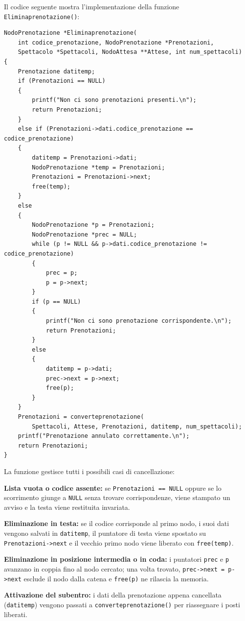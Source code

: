 \documentclass[11pt,a4paper,oneside,openany]{book}
\newenvironment{listacomp}{%
    \small
    \begin{list}{\textendash}{%
        \setlength{\topsep}{2pt}%
        \setlength{\partopsep}{0pt}%
        \setlength{\itemsep}{1pt}%
        \setlength{\parsep}{0pt}%
        \setlength{\leftmargin}{1.2em}%
    }%
}{%
    \end{list}%
}
\begin{document}
\begin{samepage}
Il codice seguente mostra l'implementazione della funzione \texttt{Eliminaprenotazione()}:

\begin{lstlisting}[caption={Eliminazione di un nodo dalla lista delle prenotazioni}]
NodoPrenotazione *Eliminaprenotazione(
    int codice_prenotazione, NodoPrenotazione *Prenotazioni,
    Spettacolo *Spettacoli, NodoAttesa **Attese, int num_spettacoli)
{
    Prenotazione datitemp;
    if (Prenotazioni == NULL)
    {
        printf("Non ci sono prenotazioni presenti.\n");
        return Prenotazioni;
    }
    else if (Prenotazioni->dati.codice_prenotazione == codice_prenotazione)
    {
        datitemp = Prenotazioni->dati;
        NodoPrenotazione *temp = Prenotazioni;
        Prenotazioni = Prenotazioni->next;
        free(temp);
    }
    else
    {
        NodoPrenotazione *p = Prenotazioni;
        NodoPrenotazione *prec = NULL;
        while (p != NULL && p->dati.codice_prenotazione != codice_prenotazione)
        {
            prec = p;
            p = p->next;
        }
        if (p == NULL)
        {
            printf("Non ci sono prenotazione corrispondente.\n");
            return Prenotazioni;
        }
        else
        {
            datitemp = p->dati;
            prec->next = p->next;
            free(p);
        }
    }
    Prenotazioni = converteprenotazione(
        Spettacoli, Attese, Prenotazioni, datitemp, num_spettacoli);
    printf("Prenotazione annulato correttamente.\n");
    return Prenotazioni;
}
\end{lstlisting}

La funzione gestisce tutti i possibili casi di cancellazione:
\begin{listacomp}
    \item \textbf{Lista vuota o codice assente:} se \texttt{Prenotazioni == NULL} oppure se lo scorrimento giunge a \texttt{NULL} senza trovare corrispondenze, viene stampato un avviso e la testa viene restituita invariata.
    \item \textbf{Eliminazione in testa:} se il codice corrisponde al primo nodo, i suoi dati vengono salvati in \texttt{datitemp}, il puntatore di testa viene spostato su \texttt{Prenotazioni->next} e il vecchio primo nodo viene liberato con \texttt{free(temp)}.
    \item \textbf{Eliminazione in posizione intermedia o in coda:} i puntatori \texttt{prec} e \texttt{p} avanzano in coppia fino al nodo cercato; una volta trovato, \texttt{prec->next = p->next} esclude il nodo dalla catena e \texttt{free(p)} ne rilascia la memoria.
    \item \textbf{Attivazione del subentro:} i dati della prenotazione appena cancellata (\texttt{datitemp}) vengono passati a \texttt{converteprenotazione()} per riassegnare i posti liberati.
\end{listacomp}
\end{samepage}
\end{document}
